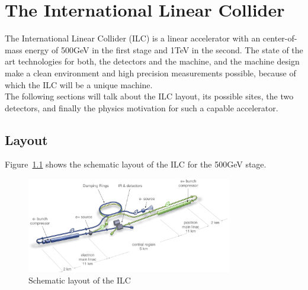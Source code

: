 \chapter{The International Linear Collider}
\label{ILC}
The International Linear Collider (ILC) is a linear \electron \positron accelerator with an center-of-mass energy of \unit{500}{GeV} in the first stage and \unit{1}{TeV} in the second.
The state of the art technologies for both, the detectors and the machine, and the machine design make a clean environment and high precision measurements possible, because of which the ILC will be a unique machine.\\
The following sections will talk about the ILC layout, its possible sites, the two detectors, and finally the physics motivation for such a capable accelerator.
\section{Layout}
\label{ILC:layout}

Figure~\ref{fig:ILC_Layout} shows the schematic layout of the ILC for the \unit{500}{GeV} stage.
\begin{figure}
\centering
\includegraphics[width=0.8\textwidth]{Figures/ILC_layout.png}
\caption[Schematic layout of the ILC]{Schematic layout of the ILC~\cite[p. 9]{TDR1}}
\label{fig:ILC_Layout}
\end{figure}

